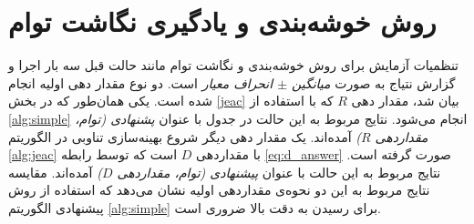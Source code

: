 \section{روش خوشه‌بندی و یادگیری نگاشت توام}\label{exp:jeac}
تنظمیات آزمایش برای روش خوشه‌بندی و نگاشت توام مانند حالت قبل سه بار اجرا و گزارش نتیاج به صورت \textit{ میانگین $\pm$ انحراف معیار } است. دو نوع  مقدار دهی اولیه انجام شده است. یکی همان‌طور که در بخش \ref{jeac} بیان شد، مقدار دهی $R$ که با استفاده از
\ref{alg:simple}
انجام می‌شود. نتایج مربوط به این حالت در جدول با عنوان
\textit{ پشنهادی (توام، مقداردهی $R$)}
آمده‌اند. یک مقدار دهی دیگر شروع بهینه‌سازی تناوبی در الگوریتم
\ref{alg:jeac}
 با مقداردهی $D$ است که توسط رابطه
\eqref{eq:d_answer}
صورت گرفته است. نتایج مربوط به این حالت با عنوان
\textit{پیشنهادی (توام، مقداردهی $D$)}
آمده‌اند. مقایسه نتایج مربوط به این دو نحوه‌ی مقداردهی اولیه نشان می‌دهد که استفاده از روش پیشنهادی الگوریتم \ref{alg:simple}  برای رسیدن به دقت بالا ضروری است.
